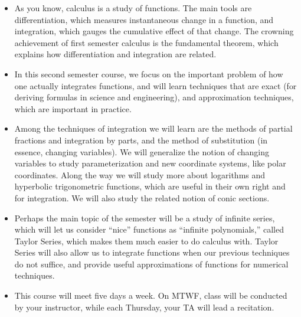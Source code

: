 \documentclass[12pt]{article}
\begin{document}
{{\begin{itemize}
\item[] As you know, calculus is a study of functions. The main tools
are differentiation, which measures instantaneous change in a function,
and integration, which gauges the cumulative effect of that 
change. The crowning achievement of first semester calculus is the fundamental
theorem, which explains how differentiation and integration are related.
\smallskip
\item[] In this second semester course, we focus on the important problem of how
one actually integrates functions, and will learn techniques that are exact
(for deriving formulas in science and engineering), and approximation techniques,
which are important in practice.
\smallskip
\item[] Among the techniques of integration we will learn are
the methods of partial fractions and integration by parts, and the
method of substitution (in essence, changing variables). We will generalize
the notion of changing variables to study parameterization and new
coordinate systems, like polar coordinates.
Along the way we will study more about logarithms and hyperbolic
trigonometric functions, which are useful in their own right and
for integration. We will also study the related notion of conic sections.
\smallskip
\item[] Perhaps the main topic of the semester
will be a study of infinite series,
which will let us consider ``nice'' functions as ``infinite polynomials,'' called Taylor Series,
which makes them much easier to do calculus with. Taylor Series will also allow us to
integrate functions when our previous techniques do not suffice, and provide useful approximations
of functions for numerical techniques.
\end{itemize}

\vskip 10pt

\begin{itemize}
\item[] This course will meet five days a week.  On MTWF, class will be
conducted by your instructor, while each Thursday, your TA
will lead a recitation.
\end{itemize}

\vskip 10pt

}}
\end{document}
